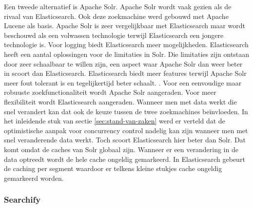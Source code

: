 Een tweede alternatief is Apache Solr. Apache Solr wordt vaak gezien als de rivaal van Elasticsearch. Ook deze zoekmachine werd gebouwd met Apache Lucene als basis. Apache Solr is zeer vergelijkbaar met Elasticsearch maar wordt beschouwd als een volwassen technologie terwijl Elasticsearch een jongere technologie is. Voor logging biedt Elasticsearch meer mogelijkheden. Elasticsearch heeft een aantal oplossingen voor de limitaties in Solr. Die limitaties zijn ontstaan door zeer schaalbaar te willen zijn, een aspect waar Apache Solr dan weer beter in scoort dan Elasticsearch. Elasticsearch biedt meer features terwijl Apache Solr meer fout tolerant is en tegelijkertijd beter schaalt. \autocite{Solr}. Voor een eenvoudige maar robuuste zoekfunctionaliteit wordt Apache Solr aangeraden. Voor meer flexibiliteit wordt Elasticsearch aangeraden. Wanneer men met data werkt die snel verandert kan dat ook de keuze tussen de twee zoekmachines beïnvloeden. In het inleidende stuk van sectie \ref{sec:stand-van-zaken} werd er verteld dat de optimistische aanpak voor concurrency control nadelig kan zijn wanneer men met snel veranderende data werkt. Toch scoort Elasticsearch hier beter dan Solr. Dat komt omdat de caches van Solr globaal zijn. Wanneer er een verandering in de data optreedt wordt de hele cache ongeldig gemarkeerd. In Elasticsearch gebeurt de caching per segment waardoor er telkens kleine stukjes cache ongeldig gemarkeerd worden.

\subsubsection{Searchify}

